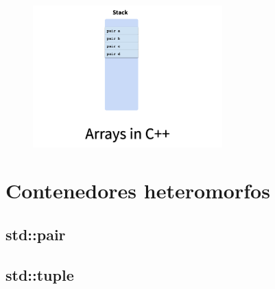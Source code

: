 \documentclass[12pt, fleqn]{report}                             %
\theoremstyle{break}                                            %
\begin{document}
            \begin{figure}[h]
                \includegraphics[width=0.65\textwidth]{ArrayCpp}
            \end{figure}

            \cite{ModernCppWhatYouNeedToKnow}

        
        
    \clearpage
    \chapter{Contenedores heteromorfos}

        \clearpage
        \section{std::pair}

        \clearpage
        \section{std::tuple}


    \clearpage
\end{document}
